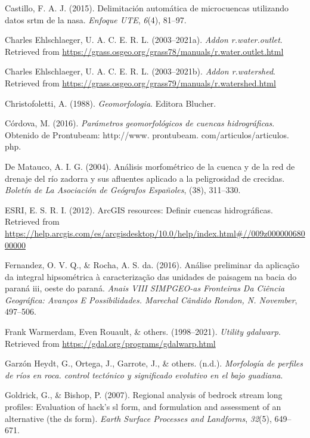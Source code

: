 \documentclass[11pt,]{article}
\begin{document}
\hypertarget{ref-castillo2015delimitacion}{}
Castillo, F. A. J. (2015). Delimitación automática de microcuencas
utilizando datos srtm de la nasa. \emph{Enfoque UTE}, \emph{6}(4),
81--97.

\hypertarget{ref-wateroutlet}{}
Charles Ehlschlaeger, U. A. C. E. R. L. (2003--2021a). \emph{Addon
r.water.outlet}. Retrieved from
\url{https://grass.osgeo.org/grass78/manuals/r.water.outlet.html}

\hypertarget{ref-watershedcharles}{}
Charles Ehlschlaeger, U. A. C. E. R. L. (2003--2021b). \emph{Addon
r.watershed}. Retrieved from
\url{https://grass.osgeo.org/grass79/manuals/r.watershed.html}

\hypertarget{ref-christofoletti1988geomorfologia}{}
Christofoletti, A. (1988). \emph{Geomorfologia}. Editora Blucher.

\hypertarget{ref-cordova2016parametros}{}
Córdova, M. (2016). \emph{Parámetros geomorfológicos de cuencas
hidrográficas}. Obtenido de Prontubeam: http://www. prontubeam.
com/articulos/articulos. php.

\hypertarget{ref-de2004analisis}{}
De Matauco, A. I. G. (2004). Análisis morfométrico de la cuenca y de la
red de drenaje del río zadorra y sus afluentes aplicado a la
peligrosidad de crecidas. \emph{Boletín de La Asociación de Geógrafos
Españoles}, (38), 311--330.

\hypertarget{ref-ESRI2012}{}
ESRI, E. S. R. I. (2012). ArcGIS resources: Definir cuencas
hidrográficas. Retrieved from
\url{https://help.arcgis.com/es/arcgisdesktop/10.0/help/index.html\#//009z00000068000000}

\hypertarget{ref-fernandez2016analise}{}
Fernandez, O. V. Q., \& Rocha, A. S. da. (2016). Análise preliminar da
aplicação da integral hipsométrica à caracterização das unidades de
paisagem na bacia do paraná iii, oeste do paraná. \emph{Anais VIII
SIMPGEO-as Fronteiras Da Ciência Geográfica: Avanços E Possibilidades.
Marechal Cândido Rondon, N. November}, 497--506.

\hypertarget{ref-gdalwarp}{}
Frank Warmerdam, Even Rouault, \& others. (1998--2021). \emph{Utility
gdalwarp}. Retrieved from \url{https://gdal.org/programs/gdalwarp.html}

\hypertarget{ref-garzonmorfologia}{}
Garzón Heydt, G., Ortega, J., Garrote, J., \& others. (n.d.).
\emph{Morfología de perfiles de ríos en roca. control tectónico y
significado evolutivo en el bajo guadiana}.

\hypertarget{ref-goldrick2007regional}{}
Goldrick, G., \& Bishop, P. (2007). Regional analysis of bedrock stream
long profiles: Evaluation of hack's sl form, and formulation and
assessment of an alternative (the ds form). \emph{Earth Surface
Processes and Landforms}, \emph{32}(5), 649--671.
\end{document}
